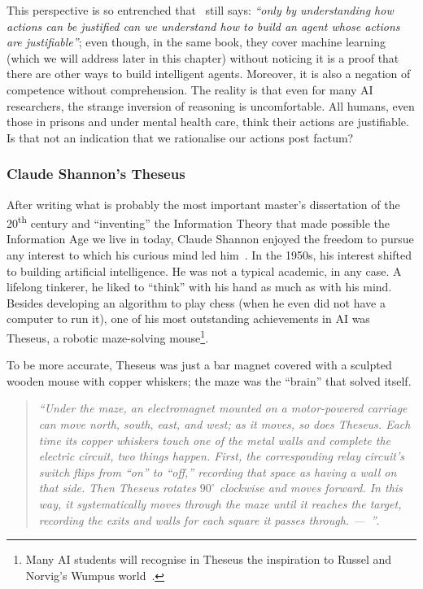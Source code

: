 This perspective is so entrenched that~\citeauthor[p. 7]{russell:2010} still says: \emph{``only by understanding how actions can be justified can we understand how to build an agent whose actions are justifiable''}; even though, in the same book, they cover machine learning (which we will address later in this chapter) without noticing it is a proof that there are other ways to build intelligent agents. Moreover, it is also a negation of competence without comprehension. The reality is that even for many AI researchers, the strange inversion of reasoning is uncomfortable. All humans, even those in prisons and under mental health care, think their actions are justifiable. Is that not an indication that we rationalise our actions post factum?

\subsubsection{Claude Shannon’s Theseus}
After writing what is probably the most important master's dissertation of the 20\textsuperscript{th} century and ``inventing'' the Information Theory that made possible the Information Age we live in today, Claude Shannon enjoyed the freedom to pursue any interest to which his curious mind led him~\cite{soni:2017}. In the 1950s, his interest shifted to building artificial intelligence. He was not a typical academic, in any case. A lifelong tinkerer, he liked to ``think'' with his hand as much as with his mind. Besides developing an algorithm to play chess (when he even did not have a computer to run it), one of his most outstanding achievements in AI was Theseus, a robotic maze-solving mouse\footnote{Many AI students will recognise in Theseus the inspiration to Russel and Norvig's Wumpus world~.}.

To be more accurate, Theseus was just a bar magnet covered with a sculpted wooden mouse with copper whiskers; the maze was the ``brain'' that solved itself.
\begin{quote}
	\small \emph{``Under the maze, an electromagnet mounted on a motor-­powered carriage can move north, south, east, and west; as it moves, so does Theseus. Each time its copper whiskers touch one of the metal walls and complete the electric circuit, two things happen. First, the corresponding relay circuit's switch flips from ``on'' to ``off,'' recording that space as having a wall on that side. Then Theseus rotates \(90^{\circ}\) clockwise and moves forward. In this way, it systematically moves through the maze until it reaches the target, recording the exits and walls for each square it passes through.\flushright{} ---~\citeauthor{klein:2018}''}.
\end{quote}
